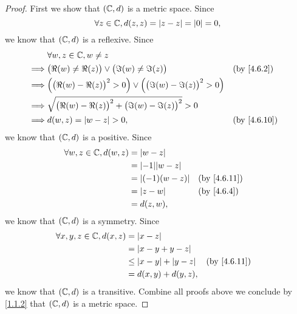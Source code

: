 \begin{proof}
  First we show that \((\mathbb{C}, d)\) is a metric space.
  Since
  \[
    \forall z \in \mathbb{C}, d(z, z) = \left\lvert z - z\right\rvert = \left\lvert0\right\rvert = 0,
  \]
  we know that \((\mathbb{C}, d)\) is a reflexive.
  Since
  \begin{align*}
             & \forall w, z \in \C, w \neq z                                                                                           \\
    \implies & \big(\Re(w) \neq \Re(z)\big) \lor \big(\Im(w) \neq \Im(z)\big)                           &  & \by{4.6.2}                \\
    \implies & \Big(\big(\Re(w) - \Re(z)\big)^2 > 0\Big) \lor \Big(\big(\Im(w) - \Im(z)\big)^2 > 0\Big)                                \\
    \implies & \sqrt{\big(\Re(w) - \Re(z)\big)^2 + \big(\Im(w) - \Im(z)\big)^2} > 0                                                    \\
    \implies & d(w, z) = \abs{w - z} > 0,                                                               &  & \text{(by \cref{4.6.10})}
  \end{align*}
  we know that \((\mathbb{C}, d)\) is a positive.
  Since
  \begin{align*}
    \forall w, z \in \C, d(w, z) & = \abs{w - z}                                         \\
                                 & = \abs{-1} \abs{w - z}                                \\
                                 & = \abs{(-1) (w - z)}   &  & \text{(by \cref{4.6.11})} \\
                                 & = \abs{z - w}          &  & \by{4.6.4}                \\
                                 & = d(z, w),
  \end{align*}
  we know that \((\mathbb{C}, d)\) is a symmetry.
  Since
  \begin{align*}
    \forall x, y, z \in \C, d(x, z) & = \abs{x - z}                                                 \\
                                    & = \abs{x - y + y - z}                                         \\
                                    & \leq \abs{x - y} + \abs{y - z} &  & \text{(by \cref{4.6.11})} \\
                                    & = d(x, y) + d(y, z),
  \end{align*}
  we know that \((\mathbb{C}, d)\) is a transitive.
  Combine all proofs above we conclude by \cref{1.1.2} that \((\mathbb{C}, d)\) is a metric space.


\end{proof}
